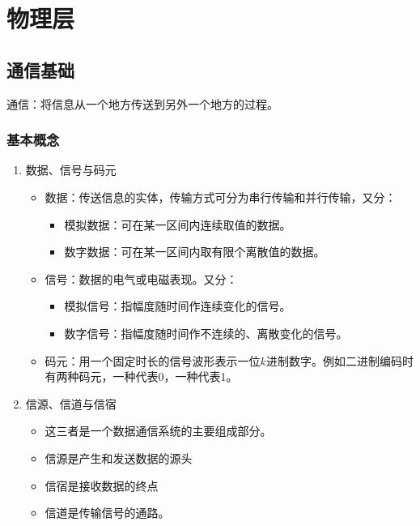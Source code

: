 \documentclass[12pt, a4paper, oneside]{ctexart}
\begin{document}
\section{物理层}

\subsection{通信基础}

通信：将信息从一个地方传送到另外一个地方的过程。

\subsubsection{基本概念}

\begin{enumerate}
    \item 数据、信号与码元
    \begin{itemize}
        \item 数据：传送信息的实体，传输方式可分为串行传输和并行传输，又分：
        \begin{itemize}
            \item 模拟数据：可在某一区间内连续取值的数据。
            \item 数字数据：可在某一区间内取有限个离散值的数据。
        \end{itemize}
        \item 信号：数据的电气或电磁表现。又分：
        \begin{itemize}
            \item 模拟信号：指幅度随时间作连续变化的信号。
            \item 数字信号：指幅度随时间作不连续的、离散变化的信号。
        \end{itemize}
        \item 码元：用一个固定时长的信号波形表示一位$k$进制数字。例如二进制编码时有两种码元，一种代表0，一种代表1。
    \end{itemize}
    \item 信源、信道与信宿
    \begin{itemize}
        \item 这三者是一个数据通信系统的主要组成部分。
        \item 信源是产生和发送数据的源头
        \item 信宿是接收数据的终点
        \item 信道是传输信号的通路。
    \end{itemize}
    \begin{figure}[h]

\end{figure}
\end{enumerate}
\end{document}
